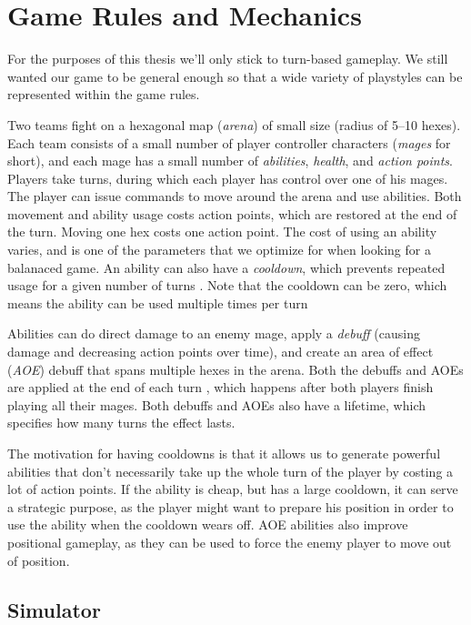 \chapter{Game Rules and Mechanics}

For the purposes of this thesis we'll only stick to turn-based gameplay. We
still wanted our game to be general enough so that a wide variety of
playstyles can be represented within the game rules.

Two teams fight on a hexagonal map (\emph{arena}) of small size (radius of
5--10 hexes). Each team consists of a small number of player controller
characters (\emph{mages} for short), and each mage has a small number of
\emph{abilities}, \emph{health}, and \emph{action points}. Players take turns, during
which each player has control over one of his mages. The player can issue
commands to move around the arena and use abilities. Both movement and ability
usage costs action points, which are restored at the end of the turn.  Moving
one hex costs one action point. The cost of using an ability varies, and is one
of the parameters that we optimize for when looking for a balanaced game. An
ability can also have a \emph{cooldown}, which prevents repeated usage for a
given number of turns . Note that the cooldown can
be zero, which means the ability can be used multiple times per turn

Abilities can do direct damage to an enemy mage, apply a \emph{debuff} (causing
damage and decreasing action points over time), and create an area of effect
(\emph{AOE}) debuff that spans multiple hexes in the arena. Both the debuffs and
AOEs are applied at the end of each turn , which happens after both players finish playing all their mages.
Both debuffs and AOEs also have a lifetime, which specifies how many turns
 the effect lasts.

The motivation for having cooldowns is that it allows us to generate powerful
abilities that don't necessarily take up the whole turn of the player by costing
a lot of action points. If the ability is cheap, but has a large cooldown, it can
serve a strategic purpose, as the player might want to prepare his position in order
to use the ability when the cooldown wears off. AOE abilities also improve positional
gameplay, as they can be used to force the enemy player to move out of position.


\section{Simulator}

